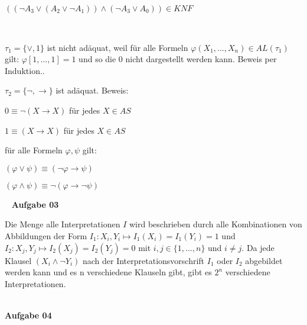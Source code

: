\documentclass[a4paper,10pt]{article}
\begin{document}
\begin{compactenum} [(a)]
\begin{compactitem}
\begin{tabbing}
				\> $ ((\lnot A_3 \vee (A_2 \vee \lnot A_1))\wedge (\lnot A_3 \vee A_0))  \in KNF $
			\end{tabbing}
		\end{compactitem}\
		\item \begin{compactitem}
			\item $ \tau_1 = \{\vee, 1\} $ ist nicht adäquat, weil für alle Formeln $ \varphi(X_1,...,X_n) \in AL(\tau_1) $ gilt: $ \varphi[1,...,1] = 1 $ und so die 0 nicht dargestellt werden kann. Beweis per Induktion.. 
			\item $ \tau_2 = \{\lnot, \rightarrow\} $ ist adäquat. Beweis:
			\begin{compactitem}
				\item $ 0 \equiv \lnot (X \rightarrow X) $  für jedes $ X \in AS $
				\item $ 1 \equiv (X \rightarrow X) $ für jedes $ X \in AS $
				\item für alle Formeln $ \varphi , \psi $ gilt:
				\begin{compactitem}
					\item $ (\varphi \vee \psi) \equiv (\lnot \varphi \rightarrow \psi) $
					\item $ (\varphi \wedge \psi) \equiv \lnot (\varphi \rightarrow \lnot \psi) $
				\end{compactitem}
			\end{compactitem}
		\end{compactitem}
	\end{compactenum} \
	\newpage
	\textbf{Aufgabe 03}
	\begin{compactenum} [(a)]
		\item Die Menge alle Interpretationen $ I $ wird beschrieben durch alle Kombinationen von Abbildungen der Form $ I_1: X_i, Y_i \longmapsto I_1(X_i) = I_1(Y_i) = 1 $ und $ I_2 : X_j, Y_j \longmapsto I_2(X_j) = I_2(Y_j) = 0 $ mit $ i,j \in \{1,...,n\} $ und $ i\neq j$. Da jede Klausel $ (X_i \wedge \lnot Y_i) $ nach der Interpretationsvorschrift $ I_1 $ oder $ I_2 $ abgebildet werden kann und es n verschiedene Klauseln gibt, gibt es $ 2^n $ verschiedene Interpretationen.
		\item 
		\item 
	\end{compactenum}\ \\
	\textbf{Aufgabe 04}\
\end{document}
